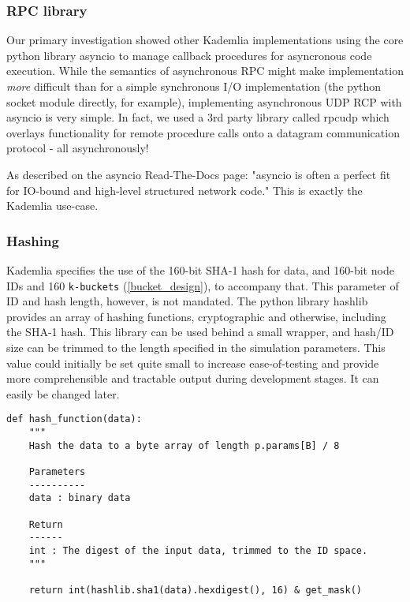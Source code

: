 \documentclass[12pt]{report}
\newcommand{\code}[1]{\colorbox{codegray}{\texttt{#1}}}
\begin{document}
            \subsubsection{RPC library}
                Our primary investigation showed other Kademlia
                implementations using the core python library asyncio to manage
                callback procedures for asyncronous code execution. While the
                semantics of asynchronous RPC might make implementation
                \textit{more} difficult than for a simple synchronous I/O
                implementation (the python socket module directly, for
                example), implementing asynchronous UDP RCP with asyncio is
                very simple.  In fact, we used a 3rd party library called
                rpcudp which overlays functionality for remote procedure calls
                onto a datagram communication protocol - all
                asynchronously!\cite{rpcudp}

                As described on the asyncio Read-The-Docs page: "asyncio is
                often a perfect fit for IO-bound and high-level structured
                network code." This is exactly the Kademlia
                use-case.\cite{asyncio}

            \subsubsection{Hashing\label{hashing_design}}
                Kademlia specifies the use of the 160-bit SHA-1 hash for data,
                and 160-bit node IDs and 160
                \code{k-buckets} (\ref{bucket_design}), to accompany that.
                This parameter of ID and hash length, however, is not mandated.
                The python library hashlib provides an array of hashing
                functions, cryptographic and otherwise, including the SHA-1
                hash.  This library can be used behind a small wrapper, and
                hash/ID size can be trimmed to the length specified in the
                simulation parameters.  This value could initially be set quite
                small to increase ease-of-testing and provide more
                comprehensible and tractable output during development stages.
                It can easily be changed later.
\begin{lstlisting}[label=hash_function]
def hash_function(data):
    """
    Hash the data to a byte array of length p.params[B] / 8

    Parameters
    ----------
    data : binary data
    
    Return
    ------
    int : The digest of the input data, trimmed to the ID space.
    """
        
    return int(hashlib.sha1(data).hexdigest(), 16) & get_mask() 
\end{lstlisting}
            
\end{document}
